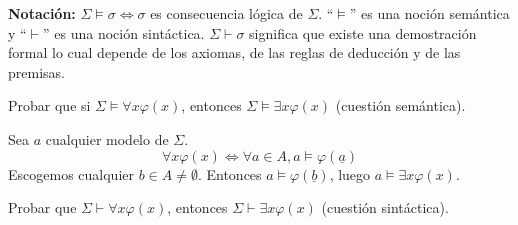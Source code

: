 \noindent \textbf{Notación: } $\Sigma \vDash \sigma \iff \sigma $ es consecuencia lógica de $\Sigma$. ``$\vDash$'' es una noción semántica y ``$\vdash$'' es una noción sintáctica. $\Sigma \vdash \sigma$ significa que existe una demostración formal lo cual depende de los axiomas, de las reglas de deducción y de las premisas.

\begin{example}
	Probar que si $\Sigma\vDash \forall x \varphi(x)$, entonces $\Sigma \vDash \exists x\varphi(x)$ (cuestión semántica). 

	Sea $a$ cualquier modelo de $\Sigma$. 
	\[\forall x\varphi(x) \iff \forall a\in A, a\vDash \varphi(\underline{a})\] Escogemos cualquier $b\in A\neq \emptyset$. Entonces $a\vDash \varphi(\underline{b})$, luego $a\vDash \exists x \varphi(x)$.
	
	Probar que $\Sigma\vdash \forall x\varphi(x)$, entonces $\Sigma \vdash \exists x\varphi(x)$ (cuestión sintáctica).
\end{example}